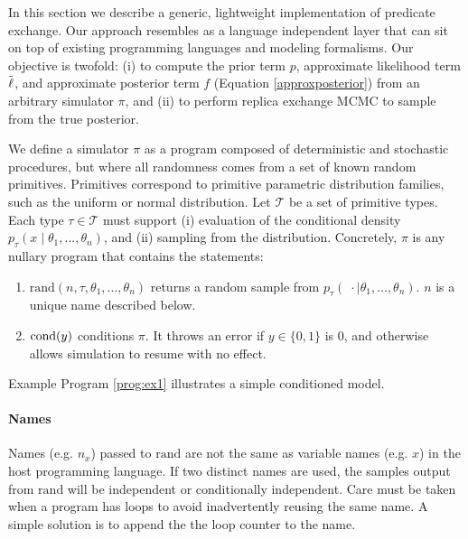 

In this section we describe a generic, lightweight implementation of predicate exchange.
Our approach resembles \citep{wingate2011lightweight, milch20071} as a language independent layer that can sit on top of existing programming languages and modeling formalisms.
Our objective is twofold: (i) to compute the prior term $p$, approximate likelihood term $\tilde{\operatorname{\ell}}$, and approximate posterior term $f$ (Equation \ref{approxposterior}) from an arbitrary simulator $\pi$, and (ii) to perform replica exchange MCMC to sample from the true posterior.

We define a simulator $\pi$ as a program composed of deterministic and stochastic procedures, but where all randomness comes from a set of known random primitives.
Primitives correspond to primitive parametric distribution families, such as the uniform or normal distribution.
Let $\mathcal{T}$ be a set of primitive types.
Each type $\tau \in \mathcal{T}$ must support (i) evaluation of the conditional density $p_\tau(x \mid \theta_1, ..., \theta_n)$, and (ii) sampling from the distribution.
Concretely, $\pi$ is any nullary program that contains the statements:

\begin{enumerate}
  \item $\textrm{rand}(n, \tau, \theta_1, ...,\theta_n)$ returns a random sample from $p_\tau(\; \cdot \mid \theta_1, ..., \theta_n)$.  $n$ is a unique name described below.
  \item $\operatorname{cond}(y)$ conditions $\pi$.  It throws an error if $y \in \{0, 1\}$ is 0, and otherwise allows simulation to resume with no effect.
\end{enumerate}

Example Program \ref{prog:ex1} illustrates a simple conditioned model.

\paragraph{Names} Names (e.g. $n_x$) passed to $\textrm{rand}$ are not the same as variable names (e.g. $x$) in the host programming language.
If two distinct names are used, the samples output from $\textrm{rand}$ will be independent or conditionally independent.
Care must be taken when a program has loops to avoid inadvertently reusing the same name.
A simple solution is to append the the loop counter to the name.



